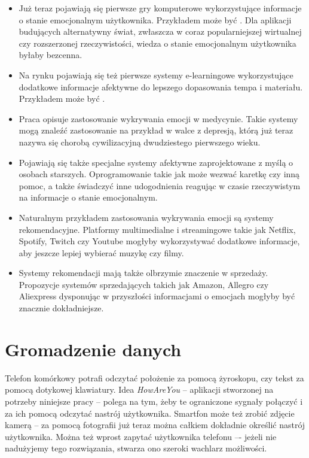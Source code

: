 \begin{itemize}	
	\item Już teraz pojawiają się pierwsze gry komputerowe wykorzystujące informacje o stanie emocjonalnym użytkownika. Przykładem może być \cite{nalepa2017affective}. Dla aplikacji budujących alternatywny świat, zwłaszcza w coraz popularniejszej wirtualnej czy rozszerzonej rzeczywistości, wiedza o stanie emocjonalnym użytkownika byłaby bezcenna.
	
	\item Na rynku pojawiają się też pierwsze systemy e-learningowe wykorzystujące dodatkowe informacje afektywne do lepszego dopasowania tempa i materiału. Przykładem może być \cite{feidakis2012design}.
	
	\item Praca \cite{hung2016predicting} opisuje zastosowanie wykrywania emocji w medycynie. Takie systemy mogą znaleźć zastosowanie na przykład w walce z depresją, którą już teraz nazywa się chorobą cywilizacyjną dwudziestego pierwszego wieku.
	
	\item Pojawiają się także specjalne systemy afektywne zaprojektowane z myślą o osobach starszych. Oprogramowanie takie jak \cite{yu2014emotion} może wezwać karetkę czy inną pomoc, a także świadczyć inne udogodnienia reagując w czasie rzeczywistym na informacje o stanie emocjonalnym.
	
	\item Naturalnym przykładem zastosowania wykrywania emocji są systemy rekomendacyjne. Platformy multimedialne i streamingowe takie jak Netflix, Spotify, Twitch czy Youtube mogłyby wykorzystywać dodatkowe informacje, aby jeszcze lepiej wybierać muzykę czy filmy.
	
	\item Systemy rekomendacji mają także olbrzymie znaczenie w sprzedaży. Propozycje systemów sprzedających takich jak Amazon, Allegro czy Aliexpress dysponując w przyszłości informacjami o emocjach mogłyby być znacznie dokładniejsze.
\end{itemize}


\section{Gromadzenie danych}
\label{sec:gromadzenieDanych}

Telefon komórkowy potrafi odczytać położenie za pomocą żyroskopu, czy tekst za pomocą dotykowej klawiatury. Idea \textit{HowAreYou} -- aplikacji stworzonej na potrzeby niniejsze pracy -- polega na tym, żeby te ograniczone sygnały połączyć i za ich pomocą odczytać nastrój użytkownika. Smartfon może też zrobić zdjęcie kamerą -- za pomocą fotografii już teraz można całkiem dokładnie określić nastrój użytkownika. Można też wprost zapytać użytkownika telefonu –- jeżeli nie nadużyjemy tego rozwiązania, stwarza ono szeroki wachlarz możliwości.

